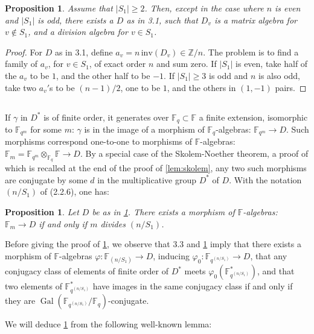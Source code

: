 \documentclass[11pt,a4paper]{article}
\theoremstyle{plain}
\newtheorem{proposition}[theorem]{Proposition}
\theoremstyle{definition}
\DeclareMathOperator{\Gal}{Gal}
\newcommand{\Fq}{\mathbb{F}_q}
\newcommand{\F}{\mathbb{F}}
\newcommand{\Z}{\mathbb{Z}}
\newcommand{\vp}{\varphi}
\begin{document}
\begin{proposition}\label{prop:division}
Assume that $|S_1| \geq 2$. Then, except in the case where $n$ is even and $|S_1|$ is odd, there exists a $D$ as in 3.1, such that $D_v$ is a matrix algebra for $v \notin S_1$, and a division algebra for $v \in S_1$.
\end{proposition}

\begin{proof}
For $D$ as in 3.1, define $a_v = n \, \mathrm{inv}(D_v) \in \Z/n$. The problem is to find a family of $a_v$, for $v \in S_1$, of exact order $n$ and sum zero. If $|S_1|$ is even, take half of the $a_v$ to be $1$, and the other half to be $-1$. If $|S_1| \geq 3$ is odd and $n$ is also odd, take two $a_v'$s to be $(n-1)/2$, one to be $1$, and the others in $(1,-1)$ pairs.
\end{proof}

\subsection{}
If $\gamma$ in $D^*$ is of finite order, it generates over $\Fq \subset \F$ a finite extension, isomorphic to $\F_{q^m}$ for some $m$: $\gamma$ is in the image of a morphism of $\Fq$-algebras: $\F_{q^m} \to D$. Such morphisms correspond one-to-one to morphisms of $\mathbb{F}$-algebras: $\mathbb{F}_m = \F_{q^m} \otimes_{\Fq} \mathbb{F} \to D$. By a special case of the Skolem-Noether theorem, a proof of which is recalled at the end of the proof of \ref{lem:skolem}, any two such morphisms are conjugate by some $d$ in the multiplicative group $D^*$ of $D$. With the notation $(n/S_1)$ of (2.2.6), one has:

\begin{proposition}\label{prop:embed}
Let $D$ be as in \ref{prop:division}. There exists a morphism of $\mathbb{F}$-algebras: $\mathbb{F}_m \to D$ if and only if $m$ divides $(n/S_1)$.
\end{proposition}

Before giving the proof of \ref{prop:embed}, we observe that 3.3 and \ref{prop:embed} imply that there exists a morphism of $\mathbb{F}$-algebras $\vp: \mathbb{F}_{(n/S_1)} \to D$, inducing $\vp_0: \F_{q^{(n/S_1)}} \to D$, that any conjugacy class of elements of finite order of $D^*$ meets $\vp_0(\F_{q^{(n/S_1)}}^*)$, and that two elements of $\F_{q^{(n/S_1)}}^*$ have images in the same conjugacy class if and only if they are $\Gal(\F_{q^{(n/S_1)}}/\Fq)$-conjugate.

We will deduce \ref{prop:embed} from the following well-known lemma:
\end{document}
